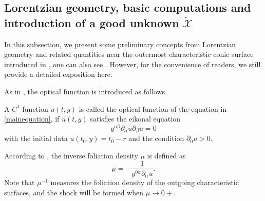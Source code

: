\documentclass[11pt,twoside]{article}
\def\al{\alpha}
\def\be{\beta}
\def\f{\frac}
\def\p{\partial}
\begin{document}
\subsection{Lorentzian geometry, basic computations and introduction of a good unknown $\check{\mathscr{X}}$}\label{Section 2-2}
In this subsection, we present some preliminary concepts from Lorentzian geometry and related quantities near the outermost characteristic
conic surface introduced in \cite{Ch1},
one can also see \cite{M-Y, Sp, L-Y}. However, for the convenience of readers, we still provide a detailed exposition here.

As in \cite{Ch1}, the optical function is introduced as follows.
\begin{definition}\label{Definition optical function}
A $C^1$ function $u(t,y)$ is called the optical function of the equation in \eqref{mainequation}, if $u(t,y)$ satisfies the eikonal equation
\begin{equation}\label{eikonal equation}
g^{\al\be}\p_{\al}u\p_{\be}u=0
\end{equation}
with the initial data $u(t_0,y)=t_0-r$ and the condition $\p_{0}u>0$.
\end{definition}

According to \cite{Ch1, Sp}, the inverse foliation density $\mu$ is defined as
\begin{equation}\label{inverse foliation density}
\mu=-\f{1}{g^{0\al}\p_{\al}u}.
\end{equation}
Note that $\mu^{-1}$ measures the foliation density of the outgoing
characteristic surfaces{,} and the shock will be formed when $\mu\rightarrow 0+$.
\end{document}
